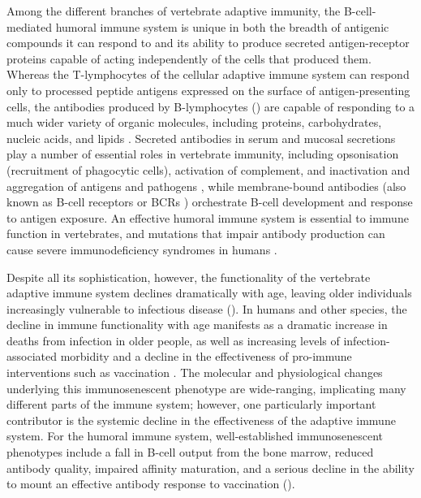 Among the different branches of vertebrate adaptive immunity, the B-cell-mediated humoral immune system is unique in both the breadth of antigenic compounds it can respond to and its ability to produce secreted antigen-receptor proteins capable of acting independently of the cells that produced them. Whereas the T-lymphocytes of the cellular adaptive immune system can respond only to processed peptide antigens expressed on the surface of antigen-presenting cells, the antibodies produced by B-lymphocytes () are capable of responding to a much wider variety of organic molecules, including proteins, carbohydrates, nucleic acids, and lipids \parencite{sompayrac2019immune}. Secreted antibodies in serum and mucosal secretions play a number of essential roles in vertebrate immunity, including opsonisation (recruitment of phagocytic cells), activation of complement, and inactivation and aggregation of antigens and pathogens \parencite{schroeder2010immunoglobulins}, while membrane-bound antibodies (also known as B-cell receptors or BCRs \parencite{bengten2015fishantibodies}) orchestrate B-cell development and response to antigen exposure. An effective humoral immune system is essential to immune function in vertebrates, and mutations that impair antibody production can cause severe immunodeficiency syndromes in humans \parencite{vanzelm2006cd19}.

Despite all its sophistication, however, the functionality of the vertebrate adaptive immune system declines dramatically with age, leaving older individuals increasingly vulnerable to infectious disease (). In humans and other species, the decline in immune functionality with age manifests as a dramatic increase in deaths from infection in older people, as well as increasing levels of infection-associated morbidity and a decline in the effectiveness of pro-immune interventions such as vaccination \parencite{sambhara2009vaccination}. The molecular and physiological changes underlying this immunosenescent phenotype are wide-ranging, implicating many different parts of the immune system; however, one particularly important contributor is the systemic decline in the effectiveness of the adaptive immune system. For the humoral immune system, well-established immunosenescent phenotypes include a fall in \naive B-cell output from the bone marrow, reduced antibody quality, impaired affinity maturation, and a serious decline in the ability to mount an effective antibody response to vaccination ().

